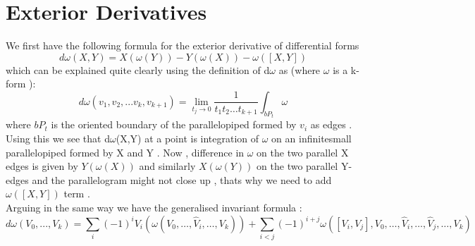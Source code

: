 \documentclass[psamsfonts]{amsart}
\theoremstyle{definition}
\theoremstyle{remark}
\numberwithin{equation}{section}
\begin{document}
 \section{Exterior Derivatives}
 We first have the following formula for the exterior derivative of differential forms 
 \[   d\omega(X,Y) = X(\omega(Y)) - Y(\omega(X)) - \omega([X,Y])                               \]
 which can be explained quite clearly using the definition of d$\omega$ as (where $\omega$ is a k-form ):
 \[                   d\omega(v_1,v_2,...v_k,v_{k+1}) = \lim_{t_j \to 0}\dfrac{1}{t_1t_2 \dots t_{k+1}}\int_{bP_t} \omega \]
 where $bP_{t}$ is the oriented boundary of the parallelopiped formed by $v_{i}$ as edges .\\
 Using this we see that d$\omega$(X,Y) at a point is integration of $\omega$ on an infinitesmall parallelopiped formed by X and Y . Now , difference in $\omega$ on the two parallel X edges is given by $Y(\omega(X))$ and similarly $X(\omega(Y))$ on the two parallel Y-edges and the parallelogram might not close up , thats why we need to add $\omega([X,Y])$ term .\\
 Arguing in the same way we have the generalised invariant formula :
 \[      d\omega (V_{0},...,V_{k})=\sum _{i}(-1)^{i}V_{i}\left(\omega \left(V_{0},\ldots ,{\hat {V}}_{i},\ldots ,V_{k}\right)\right)+\sum _{i < j}(-1)^{i+j}\omega \left(\left[V_{i},V_{j}\right],V_{0},\ldots ,{\hat {V}}_{i},\ldots ,{\hat {V}}_{j},\ldots ,V_{k}\right)                       \]  
\end{document}
